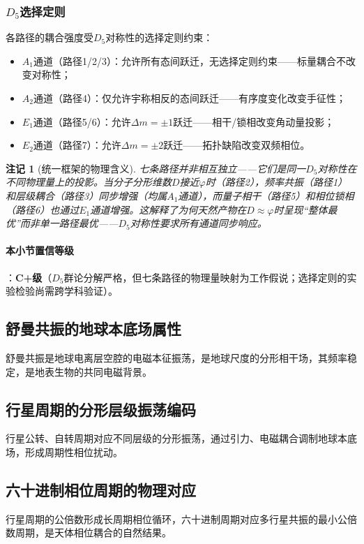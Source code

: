 \documentclass[12pt,a4paper,twocolumn]{article}
\renewcommand{\phi}{\varphi}
\newtheorem{remark}[theorem]{注记}
\begin{document}
\subsubsection{$D_5$选择定则}
各路径的耦合强度受$D_5$对称性的选择定则约束：
\begin{itemize}
\item $A_1$通道（路径1/2/3）：允许所有态间跃迁，无选择定则约束——标量耦合不改变对称性；
\item $A_2$通道（路径4）：仅允许宇称相反的态间跃迁——有序度变化改变手征性；
\item $E_1$通道（路径5/6）：允许$\Delta m = \pm 1$跃迁——相干/锁相改变角动量投影；
\item $E_2$通道（路径7）：允许$\Delta m = \pm 2$跃迁——拓扑缺陷改变双频相位。
\end{itemize}

\begin{remark}[统一框架的物理含义]
七条路径并非相互独立——它们是同一$D_5$对称性在不同物理量上的投影。当分子分形维数$D$接近$\phi$时（路径2），频率共振（路径1）和层级耦合（路径3）同步增强（均属$A_1$通道），而量子相干（路径5）和相位锁相（路径6）也通过$E_1$通道增强。这解释了为何天然产物在$D \approx \phi$时呈现``整体最优''而非单一路径最优——$D_5$对称性要求所有通道同步响应。
\end{remark}

\paragraph{本小节置信等级}：\textbf{C+级}（$D_5$群论分解严格，但七条路径的物理量映射为工作假说；选择定则的实验检验尚需跨学科验证）。

\subsection{舒曼共振的地球本底场属性}
舒曼共振是地球电离层空腔的电磁本征振荡，是地球尺度的分形相干场，其频率稳定，是地表生物的共同电磁背景。

\subsection{行星周期的分形层级振荡编码}
行星公转、自转周期对应不同层级的分形振荡，通过引力、电磁耦合调制地球本底场，形成周期性相位扰动。

\subsection{六十进制相位周期的物理对应}
行星周期的公倍数形成长周期相位循环，六十进制周期对应多行星共振的最小公倍数周期，是天体相位耦合的自然结果。
\end{document}

